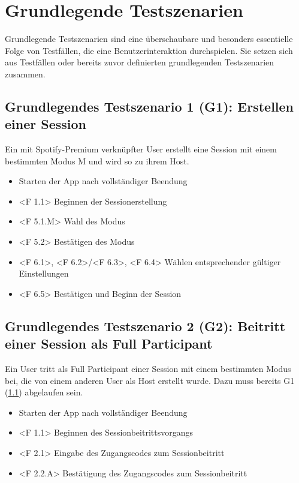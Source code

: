 \documentclass[oneside, ngerman]{sdqtechreport}
\begin{document}
\section{Grundlegende Testszenarien}
\label{sec:Tests:GrundlegendeTestszenarien}

Grundlegende Testszenarien sind eine überschaubare und besonders essentielle Folge von Testfällen, die eine Benutzerinteraktion durchspielen. Sie setzen sich aus Testfällen oder bereits zuvor definierten grundlegenden Testszenarien zusammen.

\subsection{Grundlegendes Testszenario 1 (G1): Erstellen einer Session}
\label{subsec:Tests:GrundlegendeTestszenarien:G1}
Ein mit Spotify-Premium verknüpfter User erstellt eine Session mit einem bestimmten Modus M und wird so zu ihrem Host.
\begin{itemize}
    \item <F 101> Starten der App nach vollständiger Beendung
    \item <F 1.1> Beginnen der Sessionerstellung
    \item <F 5.1.M> Wahl des Modus
    \item <F 5.2> Bestätigen des Modus
    \item <F 6.1>, <F 6.2>/<F 6.3>, <F 6.4> Wählen entsprechender gültiger Einstellungen
    \item <F 6.5> Bestätigen und Beginn der Session
\end{itemize}


\subsection{Grundlegendes Testszenario 2 (G2): Beitritt einer Session als Full Participant}
\label{subsec:Tests:GrundlegendeTestszenarien:G2}
Ein User tritt als Full Participant einer Session mit einem bestimmten Modus bei, die von einem anderen User als Host erstellt wurde.
Dazu muss bereits G1 (\ref{subsec:Tests:GrundlegendeTestszenarien:G1}) abgelaufen sein.
\begin{itemize}
    \item <F 101> Starten der App nach vollständiger Beendung
    \item <F 1.1> Beginnen des Sessionbeitrittsvorgangs
    \item <F 2.1> Eingabe des Zugangscodes zum Sessionbeitritt
    \item <F 2.2.A> Bestätigung des Zugangscodes zum Sessionbeitritt
\end{itemize}
\end{document}
